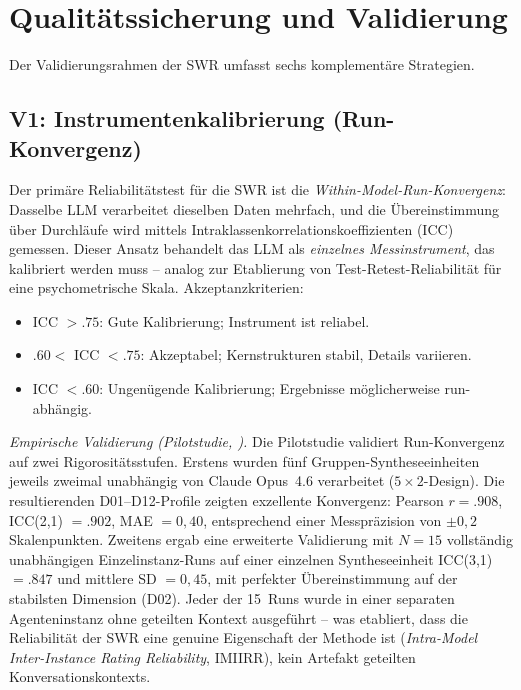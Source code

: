 \documentclass[11pt,a4paper]{article}
\theoremstyle{definition}
\theoremstyle{plain}
\theoremstyle{remark}
\begin{document}

\section{Qualit\"atssicherung und Validierung}
\label{sec:qualitaet}

Der Validierungsrahmen der SWR umfasst sechs komplement\"are Strategien.

\subsection{V1: Instrumentenkalibrierung (Run-Konvergenz)}
\label{sec:kalibrierung}

Der prim\"are Reliabilit\"atstest f\"ur die SWR ist die \emph{Within-Model-Run-Konvergenz}: Dasselbe LLM verarbeitet dieselben Daten mehrfach, und die \"Ubereinstimmung \"uber Durchl\"aufe wird mittels Intraklassenkorrelationskoeffizienten (ICC) gemessen. Dieser Ansatz behandelt das LLM als \emph{einzelnes Messinstrument}, das kalibriert werden muss -- analog zur Etablierung von Test-Retest-Reliabilit\"at f\"ur eine psychometrische Skala. Akzeptanzkriterien:
\begin{itemize}[leftmargin=*]
  \item ICC $> .75$: Gute Kalibrierung; Instrument ist reliabel.
  \item $.60 < $ ICC $< .75$: Akzeptabel; Kernstrukturen stabil, Details variieren.
  \item ICC $< .60$: Ungen\"ugende Kalibrierung; Ergebnisse m\"oglicherweise run-abh\"angig.
\end{itemize}

\emph{Empirische Validierung (Pilotstudie, \citealp{Geiger2026Elite}).} Die Pilotstudie validiert Run-Konvergenz auf zwei Rigorosit\"atsstufen. Erstens wurden f\"unf Gruppen-Syntheseeinheiten jeweils zweimal unabh\"angig von Claude Opus~4.6 verarbeitet ($5 \times 2$-Design). Die resultierenden D01--D12-Profile zeigten exzellente Konvergenz: Pearson $r = .908$, ICC(2,1) $= .902$, MAE $= 0{,}40$, entsprechend einer Messpräzision von $\pm 0{,}2$ Skalenpunkten. Zweitens ergab eine erweiterte Validierung mit $N = 15$ vollst\"andig unabh\"angigen Einzelinstanz-Runs auf einer einzelnen Syntheseeinheit ICC(3,1) $= .847$ und mittlere SD $= 0{,}45$, mit perfekter \"Ubereinstimmung auf der stabilsten Dimension (D02). Jeder der 15~Runs wurde in einer separaten Agenteninstanz ohne geteilten Kontext ausgef\"uhrt -- was etabliert, dass die Reliabilit\"at der SWR eine genuine Eigenschaft der Methode ist (\emph{Intra-Model Inter-Instance Rating Reliability}, IMIIRR), kein Artefakt geteilten Konversationskontexts.
\end{document}
